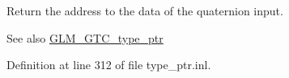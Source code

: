 Return the address to the data of the quaternion input. \begin{DoxySeeAlso}{See also}
\hyperlink{group__gtc__type__ptr}{G\+L\+M\+\_\+\+G\+T\+C\+\_\+type\+\_\+ptr} 
\end{DoxySeeAlso}


Definition at line 312 of file type\+\_\+ptr.\+inl.

